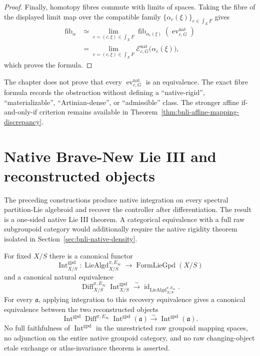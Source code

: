 \begin{proof}
Finally, homotopy fibres commute with limits of spaces.  Taking the fibre of
the displayed limit map over the compatible family
$\{\alpha_c(\xi)\}_{e\in\int_XF}$ gives
\[
\begin{aligned}
    \operatorname{fib}_{\alpha}
    &\simeq
    \operatorname*{lim}_{e=(c,\xi)\in\int_XF}
    \operatorname{fib}_{\alpha_c(\xi)}
    \left(
      \operatorname{ev}^{\mathrm{nat}}_{c,G}
    \right)\\
    &=
    \operatorname*{lim}_{e=(c,\xi)\in\int_XF}
    \mathscr E^{\mathrm{nat}}_{c,G}
    \bigl(\alpha_c(\xi)\bigr),
\end{aligned}
\]
which proves the formula.
\end{proof}

\begin{remark}
The chapter does not prove that every
$\operatorname{ev}^{\mathrm{nat}}_{c,G}$ is an equivalence.  The exact fibre
formula records the obstruction without defining a ``native-rigid'',
``materializable'', ``Artinian-dense'', or ``admissible'' class.  The stronger
affine if-and-only-if criterion remains available in
Theorem~\ref{thm:bnli-affine-mapping-discrepancy}.
\end{remark}

\section{Native Brave-New Lie III and reconstructed objects}
\label{sec:bnli-def-complete}

The preceding constructions produce native integration on every spectral
partition-Lie algebroid and recover the controller after differentiation.  The
result is a one-sided native Lie III theorem.  A categorical equivalence with a
full raw subgroupoid category would additionally require the native rigidity
theorem isolated in Section~\ref{sec:bnli-native-density}.

\begin{theorem}
\label{thm:bnli-lie-three}
For fixed $X/S$ there is a canonical functor
\[
\boxed{
    \operatorname{Int}^{\mathrm{gpd}}_{X/S}:
    \operatorname{LieAlgd}^{\pi,E_\infty}_{X/S}
    \longrightarrow
    \operatorname{FormLieGpd}(X/S)}
\]
and a canonical natural equivalence
\[
\boxed{
    \operatorname{Diff}^{\pi,E_\infty}_{X/S}
    \operatorname{Int}^{\mathrm{gpd}}_{X/S}
    \xrightarrow{\sim}
    \operatorname{id}_{\operatorname{LieAlgd}^{\pi,E_\infty}_{X/S}}.}
\]
For every $\mathfrak a$, applying integration to this recovery equivalence
gives a canonical equivalence between the two reconstructed objects
\[
\boxed{
    \operatorname{Int}^{\mathrm{gpd}}
    \operatorname{Diff}^{\pi,E_\infty}
    \operatorname{Int}^{\mathrm{gpd}}(\mathfrak a)
    \xrightarrow{\sim}
    \operatorname{Int}^{\mathrm{gpd}}(\mathfrak a).}
\]
No full faithfulness of $\operatorname{Int}^{\mathrm{gpd}}$ in the unrestricted
raw groupoid mapping spaces, no adjunction on the entire native groupoid
category, and no raw changing-object etale exchange or atlas-invariance theorem
is asserted.
\end{theorem}


